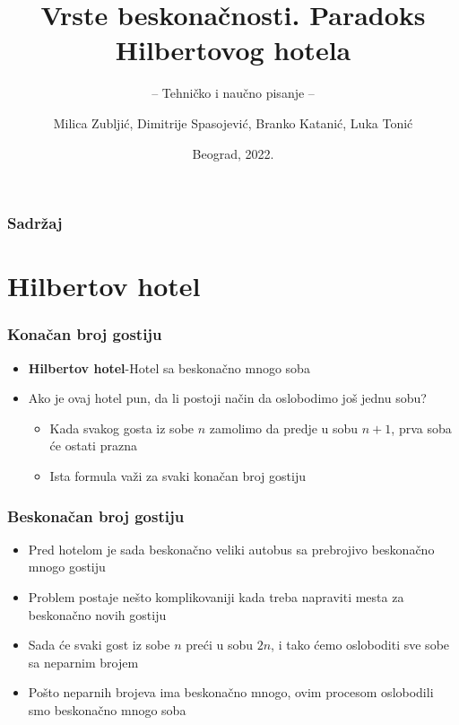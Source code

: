 \documentclass{beamer}
\title{Vrste beskonačnosti. Paradoks Hilbertovog hotela}
\subtitle{-- Tehničko i naučno pisanje --}
\author{Milica Zubljić, Dimitrije Spasojević, Branko Katanić, Luka Tonić}
\institute{Matematički fakultet\\Univerzitet u Beogradu}
\date{
	\footnotesize{Beograd, 2022.}	
}
\begin{document}
\begin{frame}
	\thispagestyle{empty}
	\titlepage
\end{frame}

\addtocounter{framenumber}{-1}

\begin{frame}
	\frametitle{Sadržaj} 
	\tableofcontents[hidesubsections] 
\end{frame}

\section{Hilbertov hotel}
\begin{frame}[fragile]\frametitle{Konačan broj gostiju}
\begin{itemize}
    \item \textbf{Hilbertov hotel}-Hotel sa beskonačno mnogo soba
    \item Ako je ovaj hotel pun, da li postoji način da oslobodimo još jednu sobu?
    \begin{itemize}
        \item Kada svakog gosta iz sobe $n$ zamolimo da predje u sobu $n+1$, prva soba će ostati prazna
        \item Ista formula važi za svaki konačan broj gostiju
    \end{itemize}
\end{itemize}
\end{frame}

\begin{frame}[fragile]\frametitle{Beskonačan broj gostiju}
\begin{itemize}
    \item Pred hotelom je sada beskonačno veliki autobus sa prebrojivo beskonačno mnogo gostiju
    \item Problem postaje nešto komplikovaniji kada treba napraviti mesta za beskonačno novih gostiju
    \item Sada će svaki gost iz sobe $n$ preći u sobu $2n$, i tako ćemo osloboditi sve sobe sa neparnim brojem
    \item Pošto neparnih brojeva ima beskonačno mnogo, ovim procesom oslobodili smo beskonačno mnogo soba
\end{itemize}
\end{frame}
\end{document}
